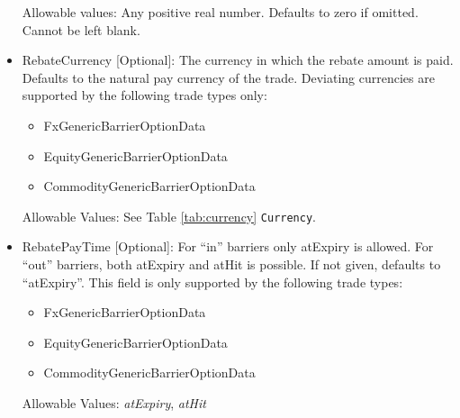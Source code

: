 \begin{itemize}
Allowable values:  Any positive real number. Defaults to zero if omitted. Cannot be left blank.

\item RebateCurrency [Optional]: The currency in which the rebate amount is paid. Defaults to the natural pay currency
  of the trade. Deviating currencies are supported by the following trade types only:

  \begin{itemize}
  \item FxGenericBarrierOptionData
  \item EquityGenericBarrierOptionData
  \item CommodityGenericBarrierOptionData
  \end{itemize}

  Allowable Values: See Table \ref{tab:currency} \lstinline!Currency!.

\item RebatePayTime [Optional]: For ``in'' barriers only atExpiry is allowed. For ``out'' barriers, both atExpiry and
  atHit is possible. If not given, defaults to ``atExpiry''. This field is only supported by the following trade types:

  \begin{itemize}
  \item FxGenericBarrierOptionData
  \item EquityGenericBarrierOptionData
  \item CommodityGenericBarrierOptionData
  \end{itemize}

  Allowable Values: \emph{atExpiry}, \emph{atHit}

\end{itemize}

